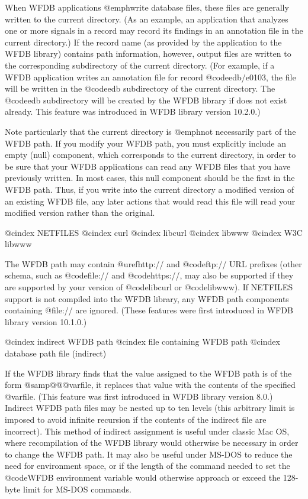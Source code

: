 {{When WFDB applications @emph{write} database files, these files are
generally written to the current directory.  (As an example, an
application that analyzes one or more signals in a record may record its
findings in an annotation file in the current directory.)  If the record
name (as provided by the application to the WFDB library) contains path
information, however, output files are written to the corresponding
subdirectory of the current directory.  (For example, if a WFDB
application writes an annotation file for record @code{edb/e0103}, the
file will be written in the @code{edb} subdirectory of the current
directory.  The @code{edb} subdirectory will be created by the WFDB
library if does not exist already.  This feature was introduced in WFDB
library version 10.2.0.)

Note particularly that the current directory is @emph{not} necessarily
part of the WFDB path.  If you modify your WFDB path, you must
explicitly include an empty (null) component, which corresponds to the
current directory, in order to be sure that your WFDB applications can
read any WFDB files that you have previously written.  In most cases,
this null component should be the first in the WFDB path.  Thus, if you
write into the current directory a modified version of an existing WFDB
file, any later actions that would read this file will read your
modified version rather than the original.

@cindex NETFILES
@cindex curl
@cindex libcurl
@cindex libwww
@cindex W3C libwww

The WFDB path may contain @uref{http://} and @code{ftp://} URL prefixes (other
schema, such as @code{file://} and @code{https://}, may also be supported if
they are supported by your version of @code{libcurl} or @code{libwww}).  If
NETFILES support is not compiled into the WFDB library, any WFDB path
components containing @file{://} are ignored.  (These features were first
introduced in WFDB library version 10.1.0.)

@cindex indirect WFDB path
@cindex file containing WFDB path
@cindex database path file (indirect)

If the WFDB library finds that the value assigned to the WFDB path is of the
form @samp{@@@var{file}}, it replaces that value with the contents of
the specified @var{file}.  (This feature was first introduced in WFDB
library version 8.0.)  Indirect WFDB path files may be nested up to ten
levels (this arbitrary limit is imposed to avoid infinite recursion if
the contents of the indirect file are incorrect).  This method of
indirect assignment is useful under classic Mac OS, where recompilation of
the WFDB library would otherwise be necessary in order to change the WFDB
path.  It may also be useful under MS-DOS to reduce the need for
environment space, or if the length of the command needed to set the
@code{WFDB} environment variable would otherwise approach or exceed the
128-byte limit for MS-DOS commands.

}}

